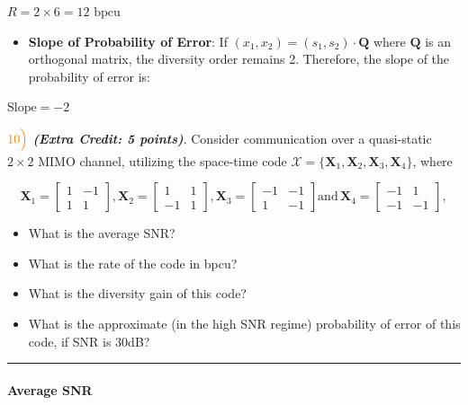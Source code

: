 \documentclass[11pt]{article}
\providecommand{\tightlist}{%
      \setlength{\itemsep}{0pt}\setlength{\parskip}{0pt}}
\begin{document}
\(R = 2 \times 6 = 12 \text{ bpcu}\)

\begin{itemize}
\tightlist
\item
  \textbf{Slope of Probability of Error}: If
  \((x_1, x_2) = (s_1, s_2) \cdot \mathbf{Q}\) where \(\mathbf{Q}\) is
  an orthogonal matrix, the diversity order remains 2. Therefore, the
  slope of the probability of error is:
\end{itemize}

\(\text{Slope} = -2\)

    \(\color{orange}10\Bigl)\) \textbf{\emph{(Extra Credit: 5 points)}}.
Consider communication over a quasi-static \(2 \times 2\) MIMO channel,
utilizing the space-time code
\(\mathcal{X} = \{\mathbf{X}_1,\mathbf{X}_2,\mathbf{X}_3,\mathbf{X}_4\}\),
where

\[
\mathbf{X}_1 =
\begin{bmatrix}
  1 & -1 \\
  1 & 1
\end{bmatrix},
\mathbf{X}_2 =
\begin{bmatrix}
  1 & 1 \\
  -1 & 1
\end{bmatrix},
\mathbf{X}_3 =
\begin{bmatrix}
  -1 & -1 \\
  1 & -1
\end{bmatrix}
\text{and} \,
\mathbf{X}_4 =
\begin{bmatrix}
  -1 & 1 \\
  -1 & -1
\end{bmatrix},
\]

\begin{itemize}
\tightlist
\item
  What is the average SNR?
\item
  What is the rate of the code in bpcu?
\item
  What is the diversity gain of this code?
\item
  What is the approximate (in the high SNR regime) probability of error
  of this code, if SNR is 30dB?
\end{itemize}

    \begin{center}\rule{0.5\linewidth}{0.5pt}\end{center}

\paragraph{Average SNR}\label{average-snr}
\end{document}
